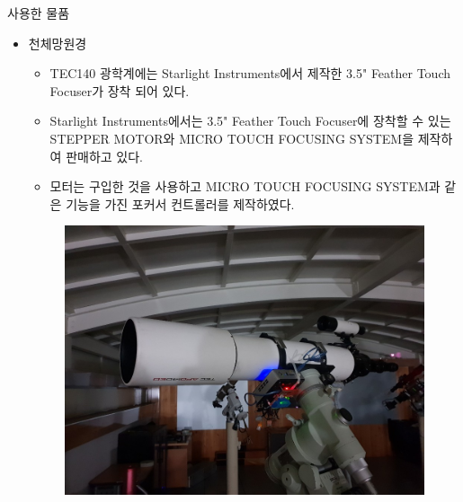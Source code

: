 \documentclass{gshs_poster_beamer}
\begin{document}
\begin{columns}[T]
\begin{posterbox}{사용한 물품}
	\begin{itemize}
		\item 천체망원경
		\begin{itemize}
			\item TEC140 광학계에는 Starlight Instruments에서 제작한 3.5" Feather Touch Focuser가 장착 되어 있다.
			\item Starlight Instruments에서는 3.5" Feather Touch Focuser에 장착할 수 있는 STEPPER MOTOR와 MICRO TOUCH FOCUSING SYSTEM을 제작하여 판매하고 있다.
			\item 모터는 구입한 것을 사용하고 MICRO TOUCH FOCUSING SYSTEM과 같은 기능을 가진 포커서 컨트롤러를 제작하였다.
		\end{itemize}
	\begin{figure}[h]
		\centering
		\includegraphics[scale=0.4]{telescope}

\end{figure}
\end{itemize}
\end{posterbox}
\end{columns}
\end{document}
